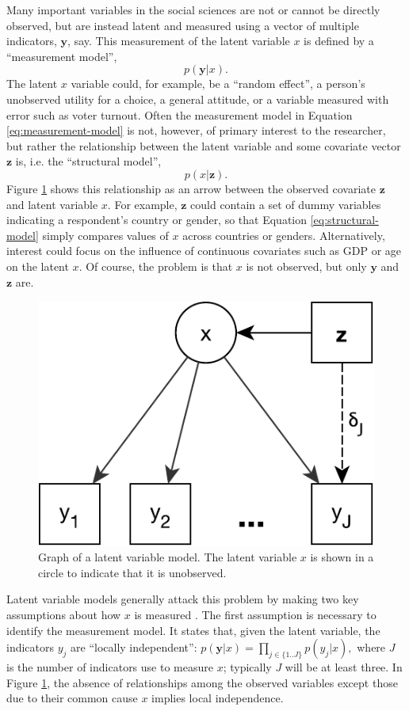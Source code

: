 \documentclass[letterpaper,12pt]{article}
\begin{document}
Many important variables in the social sciences are not or cannot be directly observed, but are instead latent  \citep{bollen2002latent} and measured using a vector of multiple indicators, $\mathbf{y}$, say. This measurement of the latent variable $x$ is defined by a ``measurement model'',
\begin{equation}
	p(\mathbf{y} | x).
		\label{eq:measurement-model}
\end{equation}
The latent $x$ variable could, for example, be a ``random effect'', a person's unobserved utility for a choice, a general attitude, or a variable measured with error such as voter turnout.
Often the measurement model in Equation \ref{eq:measurement-model} is not, however, of primary interest to the researcher, but rather  the relationship between the latent variable and some covariate vector $\mathbf{z}$ is, i.e. the ``structural model'',
\begin{equation} 
	p(x | \mathbf{z}).
		\label{eq:structural-model}
\end{equation}
Figure \ref{fig:LVM} shows this relationship as an arrow between the observed covariate $\mathbf{z}$ and latent variable $x$.
For example, $\mathbf{z}$ could contain a set of dummy variables indicating a respondent's country or gender, so that Equation \ref{eq:structural-model} simply compares values of $x$ across countries or genders. Alternatively, interest could focus on the influence of continuous covariates such as GDP or age on the latent $x$. Of course, the problem is that $x$ is not observed, but only $\mathbf{y}$ and $\mathbf{z}$ are. 

\begin{figure}\centering
	\includegraphics[width=.4\textwidth]{figures/LVM}
	\caption{Graph of a latent variable model. The latent variable $x$ is shown in a circle to indicate that it is unobserved. }
	\label{fig:LVM}
\end{figure}

Latent variable models generally attack this problem by making two key assumptions about how $x$ is measured \citep{skrondal2004generalized}. The first assumption is necessary to identify the measurement model. It states that, given the latent variable, the indicators $y_j$ are ``locally independent'': $
		p(\mathbf{y} | x) = \prod_{j \in \{1..J\}} p(y_j | x),
$ where $J$ is the number of indicators use to measure $x$; typically $J$ will be at least three. In Figure \ref{fig:LVM}, the  absence of relationships among the observed variables except those due to their common cause $x$ implies local independence.
\end{document}
